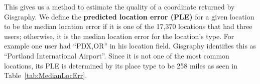This gives us a method to estimate the quality of a coordinate returned by
Gisgraphy.
We define the \textbf{predicted location error (PLE)} for a given location to
be the median location error if it is one of the 17,370 locations that had three
users; otherwise, it is the median location error for the location's type.
For example one user had ``PDX,OR'' in his location field. Gisgraphy identifies
this as ``Portland International Airport''. Since it is not one of the most
common locations, its PLE is determined by its place type to be 258 miles as
seen in Table~\ref{tab:MedianLocErr}.

